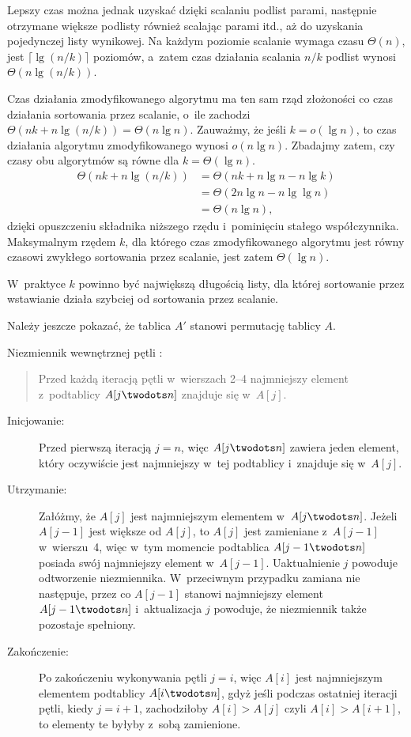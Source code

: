 Lepszy czas można jednak uzyskać dzięki scalaniu podlist parami, następnie otrzymane większe podlisty również scalając parami itd., aż do uzyskania pojedynczej listy wynikowej. Na każdym poziomie scalanie wymaga czasu $\Theta(n)$, jest $\lceil\lg(n/k)\rceil$ poziomów, a~zatem czas działania scalania $n/k$ podlist wynosi $\Theta(n\lg(n/k))$.

\subproblem %
Czas działania zmodyfikowanego algorytmu ma ten sam rząd złożoności co czas działania sortowania przez scalanie, o~ile zachodzi $\Theta(nk+n\lg(n/k))=\Theta(n\lg n)$. Zauważmy, że jeśli $k=o(\lg n)$, to czas działania algorytmu zmodyfikowanego wynosi $o(n\lg n)$. Zbadajmy zatem, czy czasy obu algorytmów są równe dla $k=\Theta(\lg n)$.
\begin{align*}
	\Theta(nk+n\lg(n/k)) &= \Theta(nk+n\lg n-n\lg k) \\
	&= \Theta(2n\lg n-n\lg\lg n) \\
	&= \Theta(n\lg n),
\end{align*}
dzięki opuszczeniu składnika niższego rzędu i~pominięciu stałego współczynnika. Maksymalnym rzędem $k$, dla którego czas zmodyfikowanego algorytmu jest równy czasowi zwykłego sortowania przez scalanie, jest zatem $\Theta(\lg n)$.

\subproblem %
W~praktyce $k$ powinno być największą długością listy, dla której sortowanie przez wstawianie działa szybciej od sortowania przez scalanie.


\subproblem %
Należy jeszcze pokazać, że tablica $A'$ stanowi permutację tablicy $A$.

\subproblem %
Niezmiennik wewnętrznej pętli :
\begin{quote}
Przed każdą iteracją pętli  w~wierszach 2\nobreakdash--4 najmniejszy element z~podtablicy $A[j\twodots n]$ znajduje się w~$A[j]$.
\end{quote}
\begin{description}
	\item[Inicjowanie:] Przed pierwszą iteracją $j=n$, więc $A[j\twodots n]$ zawiera jeden element, który oczywiście jest najmniejszy w~tej podtablicy i~znajduje się w~$A[j]$.
	\item[Utrzymanie:] Załóżmy, że $A[j]$ jest najmniejszym elementem w~$A[j\twodots n]$. Jeżeli $A[j-1]$ jest większe od $A[j]$, to $A[j]$ jest zamieniane z~$A[j-1]$ w~wierszu~4, więc w~tym momencie podtablica $A[j-1\twodots n]$ posiada swój najmniejszy element w~$A[j-1]$. Uaktualnienie $j$ powoduje odtworzenie niezmiennika. W~przeciwnym przypadku zamiana nie następuje, przez co $A[j-1]$ stanowi najmniejszy element $A[j-1\twodots n]$ i~aktualizacja $j$ powoduje, że niezmiennik także pozostaje spełniony.
	\item[Zakończenie:] Po zakończeniu wykonywania pętli $j=i$, więc $A[i]$ jest najmniejszym elementem podtablicy $A[i\twodots n]$, gdyż jeśli podczas ostatniej iteracji pętli, kiedy $j=i+1$, zachodziłoby $A[i]>A[j]$ czyli $A[i]>A[i+1]$, to elementy te byłyby z~sobą zamienione.
\end{description}

